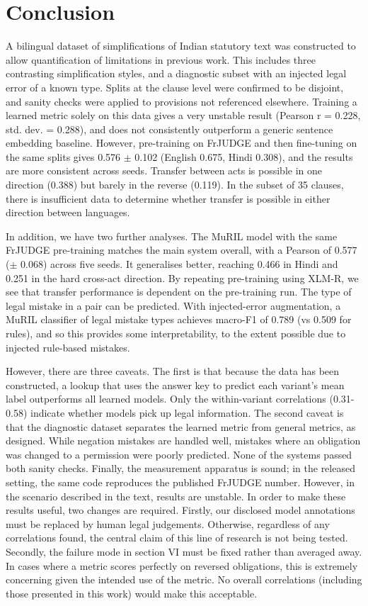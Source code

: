 \documentclass[conference]{IEEEtran}
\begin{document}
\section{Conclusion}

A bilingual dataset of simplifications of Indian statutory text was constructed to allow quantification of limitations in previous work. This includes three contrasting simplification styles, and a diagnostic subset with an injected legal error of a known type. Splits at the clause level were confirmed to be disjoint, and sanity checks were applied to provisions not referenced elsewhere. Training a learned metric solely on this data gives a very unstable result (Pearson r = 0.228, std. dev. = 0.288), and does not consistently outperform a generic sentence embedding baseline. However, pre-training on FrJUDGE and then fine-tuning on the same splits gives 0.576 \ensuremath{\pm} 0.102 (English 0.675, Hindi 0.308), and the results are more consistent across seeds. Transfer between acts is possible in one direction (0.388) but barely in the reverse (0.119). In the subset of 35 clauses, there is insufficient data to determine whether transfer is possible in either direction between languages.

In addition, we have two further analyses. The MuRIL model with the same FrJUDGE pre-training matches the main system overall, with a Pearson of 0.577 (\ensuremath{\pm} 0.068) across five seeds. It generalises better, reaching 0.466 in Hindi and 0.251 in the hard cross-act direction. By repeating pre-training using XLM-R, we see that transfer performance is dependent on the pre-training run. The type of legal mistake in a pair can be predicted. With injected-error augmentation, a MuRIL classifier of legal mistake types achieves macro-F1 of 0.789 (vs 0.509 for rules), and so this provides some interpretability, to the extent possible due to injected rule-based mistakes.

However, there are three caveats. The first is that because the data has been constructed, a lookup that uses the answer key to predict each variant's mean label outperforms all learned models. Only the within-variant correlations (0.31-0.58) indicate whether models pick up legal information. The second caveat is that the diagnostic dataset separates the learned metric from general metrics, as designed. While negation mistakes are handled well, mistakes where an obligation was changed to a permission were poorly predicted. None of the systems passed both sanity checks. Finally, the measurement apparatus is sound; in the released setting, the same code reproduces the published FrJUDGE number. However, in the scenario described in the text, results are unstable. In order to make these results useful, two changes are required. Firstly, our disclosed model annotations must be replaced by human legal judgements. Otherwise, regardless of any correlations found, the central claim of this line of research is not being tested. Secondly, the failure mode in section VI must be fixed rather than averaged away. In cases where a metric scores perfectly on reversed obligations, this is extremely concerning given the intended use of the metric. No overall correlations (including those presented in this work) would make this acceptable.
\end{document}
